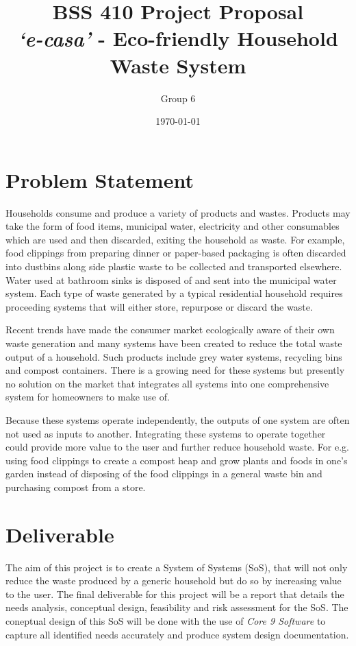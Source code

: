 \documentclass{article}
\begin{document}
\title{\vspace{-5em} BSS 410 Project Proposal\\\textit{`e-casa'} - Eco-friendly Household Waste System} %
\author{Group 6}
\date{\today}
\maketitle

\section*{Problem Statement}
 Households consume and produce a variety of products and wastes. Products may take the form of food items, municipal water, electricity and other consumables which are used and then discarded, exiting the household as waste. For example, food clippings from preparing dinner or paper-based packaging is often discarded into dustbins along side plastic waste to be collected and transported elsewhere. Water used at bathroom sinks is disposed of and sent into the municipal water system. Each type of waste generated by a typical residential household requires proceeding systems that will either store, repurpose or discard the waste.
  
  Recent trends have made the consumer market ecologically aware of their own waste generation and many systems have been created to reduce the total waste output of a household. Such products include grey water systems, recycling bins and compost containers. There is a growing need for these systems but presently no solution on the market that integrates all systems into one comprehensive system for homeowners to make use of.
  
  Because these systems operate independently, the outputs of one system are often not used as inputs to another. Integrating these systems to operate together could provide more value to the user and further reduce household waste. For e.g. using food clippings to create a compost heap and grow plants and foods in one's garden instead of disposing of the food clippings in a general waste bin and purchasing compost from a store.
    
\section*{Deliverable}
The aim of this project is to create a System of Systems (SoS), that will not only reduce the waste produced by a generic household but do so by increasing value to the user. The final deliverable for this project will be a report that details the needs analysis, conceptual design, feasibility and risk assessment for the SoS. The coneptual design of this SoS will be done with the use of \textit{Core 9 Software} to capture all identified needs accurately and produce system design documentation.
\end{document}
